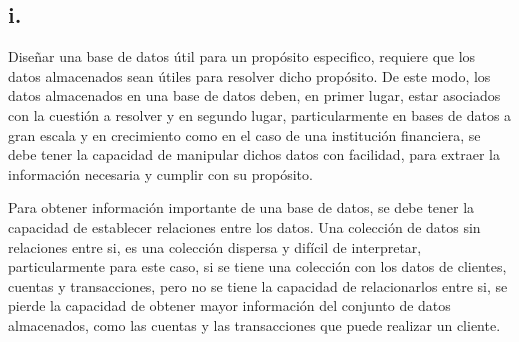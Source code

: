 \subsection*{i.}

Diseñar una base de datos útil para un propósito especifico, requiere que los datos almacenados sean útiles para resolver dicho propósito. De este modo, los datos almacenados en una base de datos deben, en primer lugar, estar asociados con la cuestión a resolver y en segundo lugar, particularmente en bases de datos a gran escala y en crecimiento como en el caso de una institución financiera, se debe tener la capacidad de manipular dichos datos con facilidad, para extraer la información necesaria y cumplir con su propósito.

Para obtener información importante de una base de datos, se debe tener la capacidad de establecer relaciones entre los datos. Una colección de datos sin relaciones entre si, es una colección dispersa y difícil de interpretar, particularmente para este caso, si se tiene una colección con los datos de clientes, cuentas y transacciones, pero no se tiene la capacidad de relacionarlos entre si, se pierde la capacidad de obtener mayor información del conjunto de datos almacenados, como las cuentas y las transacciones que puede realizar un cliente.

